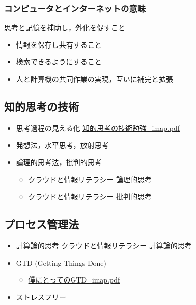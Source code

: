 \documentclass[dvipdfmx,11pat]{jarticle}
\begin{document}
\subsubsection{コンピュータとインターネットの意味}
\label{sec:org85cb32c}
思考と記憶を補助し，外化を促すこと
\begin{itemize}
\item 情報を保存し共有すること
\item 検索できるようにすること
\item 人と計算機の共同作業の実現，互いに補完と拡張
\end{itemize}
\subsection{知的思考の技術}
\label{sec:orge5ab39f}
\begin{itemize}
\item 思考過程の見える化 \href{https://masayuki054.github.io/tools\_for\_thinking\_and\_memo/i\_maps/\%E7\%9F\%A5\%E7\%9A\%84\%E6\%80\%9D\%E8\%80\%83\%E3\%81\%AE\%E6\%8A\%80\%E8\%A1\%93\%E5\%8B\%89\%E5\%BC\%B7\_imap.pdf}{知的思考の技術勉強\_imap.pdf}
\item 発想法，水平思考，放射思考
\item 論理的思考法，批判的思考
\begin{itemize}
\item \href{https://masayuki054.github.io/cloud\_and\_information\_literacy/docs/logical-thinking.html}{クラウドと情報リテラシー 論理的思考}
\item \href{https://masayuki054.github.io/cloud\_and\_information\_literacy/docs/critical\_thinking.html}{クラウドと情報リテラシー 批判的思考}
\end{itemize}
\end{itemize}
\subsection{プロセス管理法}
\label{sec:org514a864}
\begin{itemize}
\item 計算論的思考 \href{https://masayuki054.github.io/cloud\_and\_information\_literacy/docs/computational\_thinking.html}{クラウドと情報リテラシー 計算論的思考}
\item GTD (Getting Things Done)
\begin{itemize}
\item \href{https://masayuki054.github.io/cloud\_and\_information\_literacy/i\_maps/\%E5\%83\%95\%E3\%81\%AB\%E3\%81\%A8\%E3\%81\%A3\%E3\%81\%A6\%E3\%81\%AEGTD\_imap.pdf}{僕にとってのGTD\_imap.pdf}
\end{itemize}
\item ストレスフリー
\end{itemize}
\end{document}
